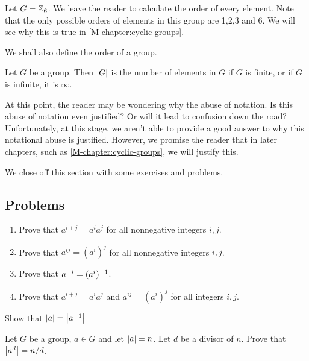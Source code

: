 \documentclass[./main.tex]{subfiles}
\begin{document}
\begin{example}
    Let $G = \mathbb{Z}_6$. We leave the reader to calculate the order of every
    element. Note that the only possible orders of elements in this group are
    1,2,3 and 6. We will see why this is true in \cref{M-chapter:cyclic-groups}.
\end{example}

We shall also define the order of a group.
\begin{definition}
\label{def:order-of-a-group}
    Let $G$ be a group. Then $\abs{G}$ is the number of elements in $G$ if $G$
    is finite, or if $G$ is infinite, it is $\infty$.    
\end{definition}
At this point, the reader may be wondering why the abuse of notation. Is this
abuse of notation even justified? Or will it lead to confusion down the road?
Unfortunately, at this stage, we aren't able to provide a good answer to why
this notational abuse is justified. However, we promise the reader that in later
chapters, such as \cref{M-chapter:cyclic-groups}, we will justify this.

We close off this section with some exercises and problems.
\subsection{Problems}

\begin{exercise}
\label{ex:power-notation}
    \begin{enumerate}
        \item Prove that $a^{i+j} = a^i a^j$ for all nonnegative integers $i, j$.
        \item Prove that $a^{ij} = (a^i)^j$ for all nonnegative integers $i, j$.
        \item Prove that $a^{-i} = (a^i)^{-1}$.
        \item Prove that $a^{i+j} = a^i a^j$ and $a^{ij} = (a^i)^j$ for all
        integers $i, j$.
    \end{enumerate}
\end{exercise}

\begin{exercise}
    Show that $\abs{a} = \abs{a^{-1}}$
\end{exercise}

\begin{exercise}
\label{ex:powering-element-orders}
    Let $G$ be a group, $a \in G$ and let $\abs{a} = n$. Let $d$ be a divisor of
    $n$. Prove that $\abs{a^d} = n/d$.
\end{exercise}
\end{document}
